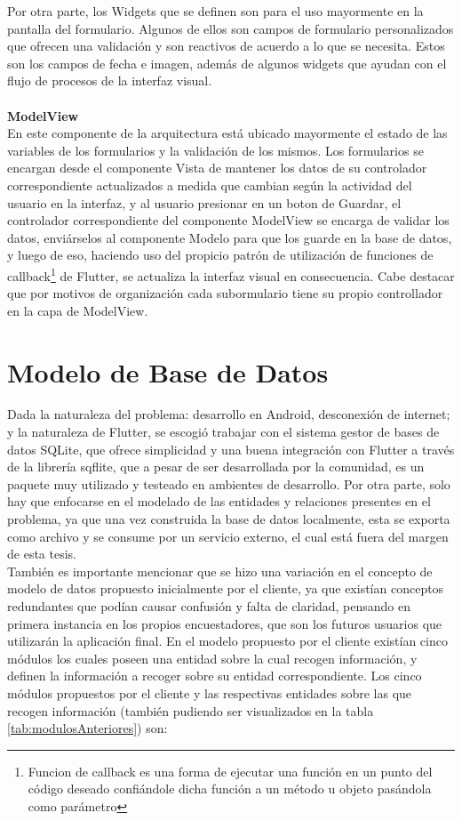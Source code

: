 Por otra parte, los Widgets que se definen son para el uso mayormente en la pantalla del formulario. Algunos de ellos son campos de formulario personalizados que
ofrecen una validación y son reactivos de acuerdo a lo que se necesita. Estos son los campos de fecha e imagen, además de algunos widgets que ayudan con el flujo
de procesos de la interfaz visual.
\\\\
\textbf{ModelView}\\
En este componente de la arquitectura está ubicado mayormente el estado de las variables de los formularios y la validación de los mismos. Los formularios se encargan
desde el componente Vista de mantener los datos de su controlador correspondiente actualizados a medida que cambian según la actividad del usuario en la interfaz,
y al usuario presionar en un boton de Guardar, el controlador correspondiente del componente ModelView se encarga de validar los datos, enviárselos al componente Modelo
para que los guarde en la base de datos, y luego de eso, haciendo uso del propicio patrón de utilización de funciones de callback\footnote{Funcion de callback es una
    forma de ejecutar una función en un punto del código deseado confiándole dicha función a un método u objeto pasándola como parámetro} de Flutter, se actualiza la interfaz
visual en consecuencia. Cabe destacar que por motivos de organización cada subormulario tiene su propio controllador en la capa de ModelView.
\\
\section{Modelo de Base de Datos} \label{section:dataModel}
Dada la naturaleza del problema: desarrollo en Android, desconexión de internet; y la naturaleza de Flutter, se escogió trabajar con el sistema gestor de bases de datos SQLite,
que ofrece simplicidad y una buena integración con Flutter a través de la librería sqflite, que a pesar de ser desarrollada por la comunidad, es un paquete muy utilizado y
testeado en ambientes de desarrollo. Por otra parte, solo hay que enfocarse en el modelado de las entidades y relaciones presentes en el problema, ya que una vez construida
la base de datos localmente, esta se exporta como archivo y se consume por un servicio externo, el cual está fuera del margen de esta tesis.\\
También es importante mencionar que se hizo una variación en el concepto de modelo de datos propuesto inicialmente por el cliente, ya que existían conceptos redundantes que podían
causar confusión y falta de claridad, pensando en primera instancia en los propios encuestadores, que son los futuros usuarios que utilizarán la aplicación final. En el modelo propuesto
por el cliente existían cinco módulos los cuales poseen una entidad sobre la cual recogen información, y definen la información a recoger sobre su entidad correspondiente.
Los cinco módulos propuestos por el cliente y las respectivas entidades sobre las que recogen información (también pudiendo ser visualizados en la tabla \ref{tab:modulosAnteriores}) son:
\pagebreak

